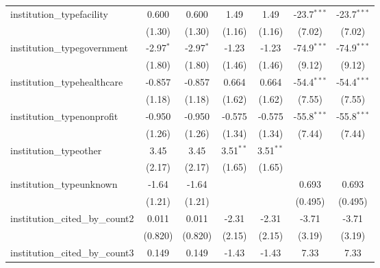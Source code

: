 \begin{tabular}{lcccccc}
   institution\_typefacility             & 0.600         & 0.600         & 1.49          & 1.49          & -23.7$^{***}$ & -23.7$^{***}$\\   
                                         & (1.30)        & (1.30)        & (1.16)        & (1.16)        & (7.02)        & (7.02)\\   
   institution\_typegovernment           & -2.97$^{*}$   & -2.97$^{*}$   & -1.23         & -1.23         & -74.9$^{***}$ & -74.9$^{***}$\\   
                                         & (1.80)        & (1.80)        & (1.46)        & (1.46)        & (9.12)        & (9.12)\\   
   institution\_typehealthcare           & -0.857        & -0.857        & 0.664         & 0.664         & -54.4$^{***}$ & -54.4$^{***}$\\   
                                         & (1.18)        & (1.18)        & (1.62)        & (1.62)        & (7.55)        & (7.55)\\   
   institution\_typenonprofit            & -0.950        & -0.950        & -0.575        & -0.575        & -55.8$^{***}$ & -55.8$^{***}$\\   
                                         & (1.26)        & (1.26)        & (1.34)        & (1.34)        & (7.44)        & (7.44)\\   
   institution\_typeother                & 3.45          & 3.45          & 3.51$^{**}$   & 3.51$^{**}$   &               &   \\   
                                         & (2.17)        & (2.17)        & (1.65)        & (1.65)        &               &   \\   
   institution\_typeunknown              & -1.64         & -1.64         &               &               & 0.693         & 0.693\\   
                                         & (1.21)        & (1.21)        &               &               & (0.495)       & (0.495)\\   
   institution\_cited\_by\_count2        & 0.011         & 0.011         & -2.31         & -2.31         & -3.71         & -3.71\\   
                                         & (0.820)       & (0.820)       & (2.15)        & (2.15)        & (3.19)        & (3.19)\\   
   institution\_cited\_by\_count3        & 0.149         & 0.149         & -1.43         & -1.43         & 7.33          & 7.33\\   

\end{tabular}
